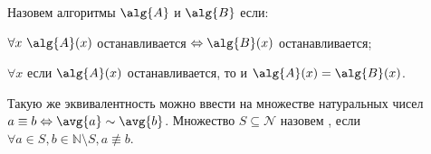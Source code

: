 




\setcounter{curtask}{9}


\begin{definition*}
    Назовем алгоритмы $\alg{A}$ и $\alg{B}$  если:
    \begin{itemtask}
        \item $\forall x\  \alg{A}(x)$ останавливается $\Leftrightarrow \alg{B}(x)$ останавливается;
        \item $\forall x$ если $\alg{A}(x)$ останавливается, то и $\alg{A}(x) = \alg{B}(x)$.
    \end{itemtask}

    Такую же эквивалентность можно ввести на множестве натуральных чисел $a \equiv b \Leftrightarrow
    \avg{a} \sim \avg{b}$. Множество $S \subseteq \mathcal{N}$ назовем , если
    $\forall a \in S, b \in \mathbb{N} \setminus S, a \not\equiv b$.    
\end{definition*}



\breakline



